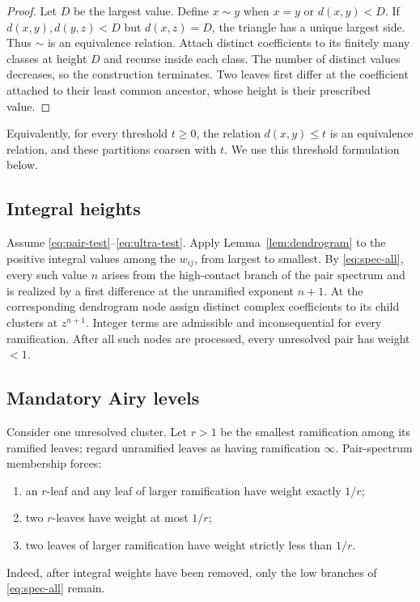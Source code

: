 \documentclass[11pt,a4paper]{amsart}
\theoremstyle{plain}
\theoremstyle{definition}
\begin{document}
\begin{proof}
Let $D$ be the largest value.  Define $x\sim y$ when $x=y$ or $d(x,y)<D$.  If
$d(x,y),d(y,z)<D$ but $d(x,z)=D$, the triangle has a unique largest side.  Thus $\sim$ is an
equivalence relation.  Attach distinct coefficients to its finitely many classes at height $D$ and
recurse inside each class.  The number of distinct values decreases, so the construction
terminates.  Two leaves first differ at the coefficient attached to their least common ancestor,
whose height is their prescribed value.
\end{proof}

Equivalently, for every threshold $t\ge0$, the relation $d(x,y)\le t$ is an equivalence relation,
and these partitions coarsen with $t$.  We use this threshold formulation below.

\subsection{Integral heights}

Assume \eqref{eq:pair-test}--\eqref{eq:ultra-test}.  Apply
Lemma~\ref{lem:dendrogram} to the positive integral values among the $w_{ij}$, from largest to
smallest.  By \eqref{eq:spec-all}, every such value $n$ arises from the high-contact branch of the
pair spectrum and is realized by a first difference at the unramified exponent $n+1$.  At the
corresponding dendrogram node assign distinct complex coefficients to its child clusters at
$z^{n+1}$.  Integer terms are admissible and inconsequential for every ramification.  After all
such nodes are processed, every unresolved pair has weight $<1$.

\subsection{Mandatory Airy levels}

Consider one unresolved cluster.  Let $r>1$ be the smallest ramification among its ramified leaves;
regard unramified leaves as having ramification $\infty$.  Pair-spectrum membership forces:
\begin{enumerate}[label=(\roman*)]
\item an $r$-leaf and any leaf of larger ramification have weight exactly $1/r$;
\item two $r$-leaves have weight at most $1/r$;
\item two leaves of larger ramification have weight strictly less than $1/r$.
\end{enumerate}
Indeed, after integral weights have been removed, only the low branches of
\eqref{eq:spec-all} remain.
\end{document}
